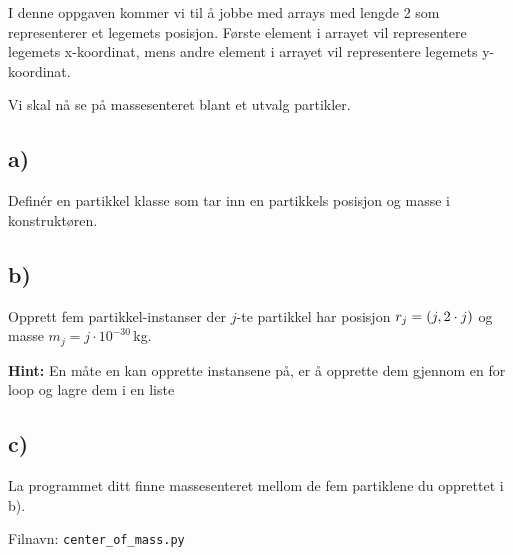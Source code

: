 \documentclass[10pt,a4paper]{article}
\begin{document}
I denne oppgaven kommer vi til å jobbe med arrays med lengde 2 som representerer et legemets posisjon. Første element i arrayet vil representere legemets x-koordinat, mens andre element i arrayet vil representere legemets y-koordinat.
 
Vi skal nå se på massesenteret blant et utvalg partikler. 
\subsection*{a)}
Definér en partikkel klasse som tar inn en partikkels posisjon og masse i konstruktøren.  
\subsection*{b)}
Opprett fem partikkel-instanser der $j$-te partikkel har posisjon $r_j = \qty(j,2\cdot j)$ og masse $m_j = j\cdot 10^{-30}\,$kg. 
 
\textbf{Hint:} En måte en kan opprette instansene på, er å opprette dem gjennom en for loop og lagre dem i en liste
\subsection*{c)}
La programmet ditt finne massesenteret mellom de fem partiklene du opprettet i b). 
 
Filnavn: \texttt{center\_of\_mass.py}
 
\end{document}
